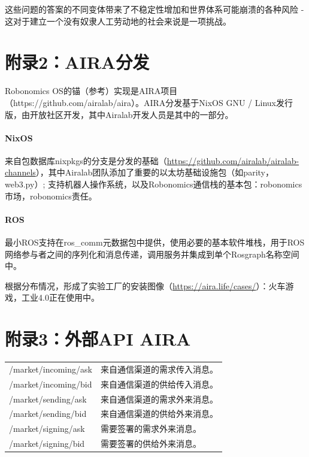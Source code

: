 \documentclass[UTF8]{article}
\begin{document}
这些问题的答案的不同变体带来了不稳定性增加和世界体系可能崩溃的各种风险 - 这对于建立一个没有奴隶人工劳动地的社会来说是一项挑战。

\section*{附录2：AIRA分发}

Robonomics OS的锚（参考）实现是AIRA项目（https://github.com/airalab/aira）。AIRA分发基于NixOS GNU / Linux发行版，由开放社区开发，其中Airalab开发人员是其中的一部分。

\paragraph{NixOS}

来自包数据库nixpkgs的分支是分发的基础（\url{https://github.com/airalab/airalab-channels}），其中Airalab团队添加了重要的以太坊基础设施包（如parity，web3.py）; 支持机器人操作系统，以及Robonomics通信栈的基本包：robonomics市场，robonomics责任。

\paragraph*{ROS}

最小ROS支持在ros\_comm元数据包中提供，使用必要的基本软件堆栈，用于ROS网络参与者之间的序列化和消息传递，调用服务并集成到单个Rosgraph名称空间中。

根据分布情况，形成了实验工厂的安装图像（\url{https://aira.life/cases/}）：火车游戏，工业4.0正在使用中。

\section*{附录3：外部API AIRA}

\begin{tabular}{ l |l}
	/market/incoming/ask & 来自通信渠道的需求传入消息。 \\
	/market/incoming/bid & 来自通信渠道的供给传入消息。 \\
	/market/sending/ask & 来自通信渠道的需求外来消息。 \\
	/market/sending/bid & 来自通信渠道的供给外来消息。 \\
	/market/signing/ask & 需要签署的需求外来消息。 \\
	/market/signing/bid & 需要签署的供给外来消息。 \\
\end{tabular}
\end{document}
